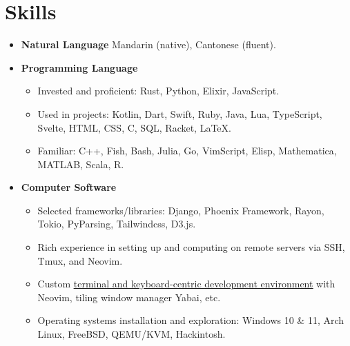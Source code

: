 \documentclass[letterpaper,11pt]{article}
\newcommand{\uhref}[2]{\href{#1}{\underline{#2}}}
\begin{document}
\section{Skills}
\begin{itemize}[leftmargin=0.5cm, label={}]
\item \textbf{Natural Language}\quad
    Mandarin (native), Cantonese (fluent).\vspace{-4pt}
\item \textbf{Programming Language}\vspace{-4pt}
    \begin{itemize}\small
    \item Invested and proficient: Rust, Python, Elixir, JavaScript.
    \item Used in projects:
        Kotlin, Dart, Swift, Ruby, Java, Lua, TypeScript,
        Svelte, HTML, CSS, C, SQL, Racket, \LaTeX{}.
    \item Familiar: C++, Fish, Bash, Julia, Go, VimScript, Elisp,
        Mathematica, MATLAB, Scala, R.\vspace{-4pt}
    \end{itemize}
\item \textbf{Computer Software}\vspace{-4pt}
    \begin{itemize}\small
    \item Selected frameworks/libraries:
        Django, Phoenix Framework, Rayon, Tokio, PyParsing, Tailwindcss, D3.js.
    \item Rich experience in setting up and computing on remote servers via
        SSH, Tmux, and Neovim.
    \item Custom \uhref{https://github.com/SichangHe/.config}
        {terminal and keyboard-centric development environment}
        with Neovim, tiling window manager Yabai, etc.
    \item Operating systems installation and exploration:
        Windows 10 \& 11, Arch Linux, FreeBSD, QEMU/KVM, Hackintosh.
    \end{itemize}
\end{itemize}
\end{document}
